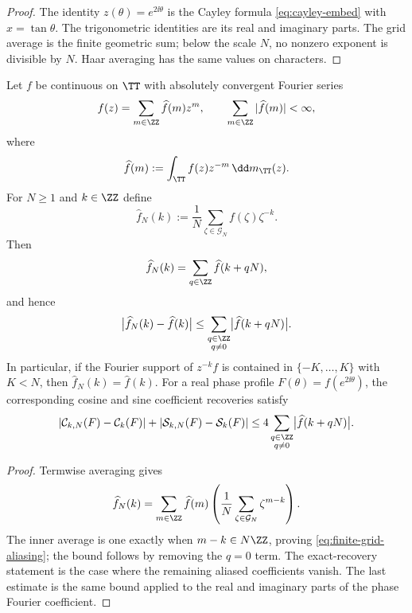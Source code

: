 \begin{proof}
The identity \(z(\theta)=e^{2\ii\theta}\) is the Cayley formula
\eqref{eq:cayley-embed} with \(x=\tan\theta\).  The trigonometric identities
are its real and imaginary parts.  The grid average is the finite geometric
sum; below the scale \(N\), no nonzero exponent is divisible by \(N\).  Haar
averaging has the same values on characters.
\end{proof}

\begin{proposition}%
\label{prop:finite-grid-coefficient-recovery}
Let \(f\) be continuous on \(\TT\) with absolutely convergent Fourier series
\[
f(z)=\sum_{m\in\ZZ}\widehat f(m)z^m,
\qquad
\sum_{m\in\ZZ}|\widehat f(m)|<\infty,
\]
where
\[
\widehat f(m):=\int_{\TT}f(z)z^{-m}\,\dd m_{\TT}(z).
\]
For \(N\ge1\) and \(k\in\ZZ\) define
\[
\widehat f_N(k):=\frac1N\sum_{\zeta\in\mathcal G_N}f(\zeta)\zeta^{-k}.
\]
Then
\begin{equation}\label{eq:finite-grid-aliasing}
\widehat f_N(k)=\sum_{q\in\ZZ}\widehat f(k+qN),
\end{equation}
and hence
\begin{equation}\label{eq:finite-grid-aliasing-bound}
\bigl|\widehat f_N(k)-\widehat f(k)\bigr|
\le
\sum_{\substack{q\in\ZZ\\q\ne0}}\bigl|\widehat f(k+qN)\bigr|.
\end{equation}
In particular, if the Fourier support of \(z^{-k}f\) is contained in
\(\{-K,\ldots,K\}\) with \(K<N\), then \(\widehat f_N(k)=\widehat f(k)\).
For a real phase profile \(F(\theta)=f(e^{2\ii\theta})\), the corresponding
cosine and sine coefficient recoveries satisfy
\[
|\mathcal C_{k,N}(F)-\mathcal C_k(F)|
+|\mathcal S_{k,N}(F)-\mathcal S_k(F)|
\le
4\sum_{\substack{q\in\ZZ\\q\ne0}}\bigl|\widehat f(k+qN)\bigr|.
\]
\end{proposition}

\begin{proof}
Termwise averaging gives
\[
\widehat f_N(k)
=\sum_{m\in\ZZ}\widehat f(m)
\left(\frac1N\sum_{\zeta\in\mathcal G_N}\zeta^{m-k}\right).
\]
The inner average is one exactly when \(m-k\in N\ZZ\), proving
\eqref{eq:finite-grid-aliasing}; the bound follows by removing the
\(q=0\) term.  The exact-recovery statement is the case where the remaining
aliased coefficients vanish.  The last estimate is the same bound applied to
the real and imaginary parts of the phase Fourier coefficient.
\end{proof}

